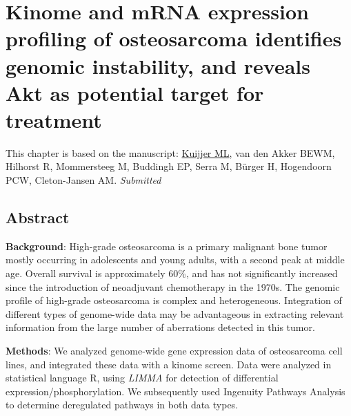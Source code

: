 


%


\chapter{Kinome and mRNA expression profiling of osteosarcoma identifies genomic instability, and reveals Akt as potential target for treatment}\label{ch6}
\thispagestyle{empty}				%

\vfill

\vspace{0.5cm}
This chapter is based on the manuscript:
\underline{Kuijjer ML}, van den Akker BEWM, Hilhorst R, Mommersteeg M, Buddingh EP, Serra M, B{\"u}rger H, Hogendoorn PCW, Cleton-Jansen AM. {\it Submitted}

\newpage


\section{Abstract}\label{abstract6}
\textbf{Background}: High\hyp{}grade osteosarcoma is a primary malignant bone tumor mostly occurring in adolescents and young adults, with a second peak at middle age. Overall survival is approximately 60\%, and has not significantly increased since the introduction of neoadjuvant chemotherapy in the 1970s. The genomic profile of high\hyp{}grade osteosarcoma is complex and heterogeneous. Integration of different types of genome\hyp{}wide data may be advantageous in extracting relevant information from the large number of aberrations detected in this tumor.

\textbf{Methods}: We analyzed genome\hyp{}wide gene expression data of osteosarcoma cell lines, and integrated these data with a kinome screen. Data were analyzed in statistical language R, using {\it LIMMA} for detection of differential expression/phosphorylation. We subsequently used Ingenuity Pathways Analysis to determine deregulated pathways in both data types.

